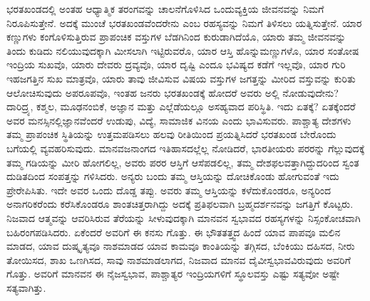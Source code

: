ಭರತಖಂಡದಲ್ಲಿ ಅಂತಹ ಆಧ್ಯಾತ್ಮಿಕ ತರಂಗವನ್ನು ಚಾಲನೆಗೊಳಿಸಿದ ಒಂದು\break ವ್ಯಕ್ತಿಯ ಜೀವನವನ್ನು ನಿಮಗೆ ನಿರೂಪಿಸುತ್ತೇನೆ. ಅದಕ್ಕೆ ಮುಂಚೆ ಭರತಖಂಡವೆಂದರೇನು ಎಂಬ ರಹಸ್ಯವನ್ನು ನಿಮಗೆ ತಿಳಿಸಲು ಯತ್ನಿಸುತ್ತೇನೆ. ಯಾರ ಕಣ್ಣುಗಳು ಕಂಗೊಳಿಸುತ್ತಿರುವ ಪ್ರಾಪಂಚಿಕ ವಸ್ತುಗಳ ಬೆಡಗಿನಿಂದ ಕುರುಡಾಗಿದೆಯೊ, ಯಾರು ತಮ್ಮ ಜೀವನವನ್ನು ತಿಂದು ಕುಡಿದು ನಲಿಯುವುದಕ್ಕಾಗಿ ಮೀಸಲಾಗಿ ಇಟ್ಟಿರುವರೊ, ಯಾರ ಆಸ್ತಿ ಹೊನ್ನು\break ಮಣ್ಣುಗಳೊ, ಯಾರ ಸಂತೋಷ ಇಂದ್ರಿಯ ಸುಖವೊ, ಯಾರು ದೇವರು ದ್ರವ್ಯವೊ, ಯಾರ ದೃಷ್ಟಿ ಎಂದೂ ಭವಿಷ್ಯದ ಕಡೆಗೆ ಇಲ್ಲವೊ, ಯಾರ ಗುರಿ ಇಹಜಗತ್ತಿನ ಸುಖ ಮಾತ್ರವೊ, ಯಾರು ತಾವು ಜೀವಿಸುವ ವಿಷಯ ವಸ್ತುಗಳ ಜಗತ್ತನ್ನು ಮೀರಿದ ವಸ್ತುವನ್ನು ಕುರಿತು ಆಲೋಚಿಸುವುದು ಅಪರೂಪವೊ, ಇಂತಹ ಜನರು ಭರತಖಂಡಕ್ಕೆ ಹೋದರೆ ಅವರು ಅಲ್ಲಿ ನೋಡುವುದೇನು? ದಾರಿದ್ರ್ಯ, ಕಶ್ಮಲ, ಮೂಢನಂಬಿಕೆ, ಅಜ್ಞಾನ ಮತ್ತು ಎಲ್ಲೆಡೆಯಲ್ಲೂ ಅಸಹ್ಯವಾದ ಪರಿಸ್ಥಿತಿ. ಇದು ಏತಕ್ಕೆ? ಏತಕ್ಕೆಂದರೆ ಅವರ ಮನಸ್ಸಿನಲ್ಲಿ\break ಜ್ಞಾನವೆಂದರೆ ಉಡುಪು, ವಿದ್ಯೆ, ಸಾಮಾಜಿಕ ವಿನಯ ಎಂದು ಭಾವಿಸುವರು. ಪಾಶ್ಚಾತ್ಯ ದೇಶಗಳು ತಮ್ಮ ಪ್ರಾಪಂಚಿಕ ಸ್ಥಿತಿಯನ್ನು ಉತ್ತಮಪಡಿಸಲು ಹಲವು ರೀತಿಯಿಂದ ಪ್ರಯತ್ನಿಸಿದರೆ ಭರತಖಂಡ ಬೇರೊಂದು ಬಗೆಯಲ್ಲಿ ವ್ಯವಹರಿಸುವುದು. ಮಾನವ\break ಜನಾಂಗದ ಇತಿಹಾಸದಲ್ಲೆಲ್ಲ ನೋಡಿದರೆ, ಭಾರತೀಯರು ಪರರನ್ನು ಗೆಲ್ಲುವುದಕ್ಕೆ ತಮ್ಮ ಗಡಿಯನ್ನು ಮೀರಿ ಹೋಗಲಿಲ್ಲ, ಅವರು ಪರರ ಆಸ್ತಿಗೆ ಆಸೆಪಡಲಿಲ್ಲ, ತಮ್ಮ ದೇಶ\break ಫಲವತ್ತಾಗಿದ್ದುದರಿಂದ ಸ್ವಂತ ದುಡಿತದಿಂದ ಸಂಪತ್ತನ್ನು ಗಳಿಸಿದರು. ಅನ್ಯರು ಬಂದು ತಮ್ಮ ಆಸ್ತಿಯನ್ನು ದೋಚಿಕೊಂಡು ಹೋಗುವಂತೆ ಇದು ಪ್ರೇರೇಪಿಸಿತು. ಇದೇ ಅವರ ಒಂದು ದೊಡ್ಡ ತಪ್ಪು. ಅವರು ತಮ್ಮ ಆಸ್ತಿಯನ್ನು ಕಳೆದುಕೊಂಡರೂ, ಅನ್ಯರಿಂದ ಅನಾಗರಿಕರೆಂದು ಕರೆಸಿಕೊಂಡರೂ ಶಾಂತಚಿತ್ತರಾಗಿದ್ದು ಅದಕ್ಕೆ ಪ್ರತಿಫಲವಾಗಿ ಬ್ರಹ್ಮದರ್ಶನವನ್ನು ಜಗತ್ತಿಗೆ ಕೊಟ್ಟರು. ನಿಜವಾದ ಆತ್ಮವನ್ನು ಆವರಿಸಿರುವ ತೆರೆಯನ್ನು ಸೀಳುವುದಕ್ಕಾಗಿ ಮಾನವನ ಸ್ವಭಾವದ ರಹಸ್ಯಗಳನ್ನು ನಿಸ್ಸಂಕೋಚವಾಗಿ ಬಹಿರಂಗಪಡಿಸಿದರು. ಏಕೆಂದರೆ ಅವರಿಗೆ ಈ ಕನಸು ಗೊತ್ತು. ಈ ಭೌತತತ್ತ್ವದ ಹಿಂದೆ ಯಾವ ಪಾಪವೂ ಮಲಿನ ಮಾಡದ, ಯಾವ ದುಷ್ಕೃತ್ಯವೂ ನಾಶಮಾಡದ ಯಾವ ಕಾಮವೂ ಕಾಂತಿಯನ್ನು ತಗ್ಗಿಸದ, ಬೆಂಕಿಯು ದಹಿಸದ, ನೀರು ತೋಯಿಸದ, ಶಾಖ ಒಣಗಿಸದ, ಸಾವು ನಾಶಮಾಡಲಾಗದ, ನಿಜವಾದ ಮಾನವ ದೈವೀಸ್ವಭಾವವಿರುವುದು ಅವರಿಗೆ ಗೊತ್ತು. ಅವರಿಗೆ ಮಾನವನ ಈ ನೈಜಸ್ವಭಾವ, ಪಾಶ್ಚಾತ್ಯರ ಇಂದ್ರಿಯಗಳಿಗೆ ಸ್ಥೂಲವಸ್ತು ಎಷ್ಟು ಸತ್ಯವೋ ಅಷ್ಟೇ ಸತ್ಯವಾಗಿತ್ತು.

